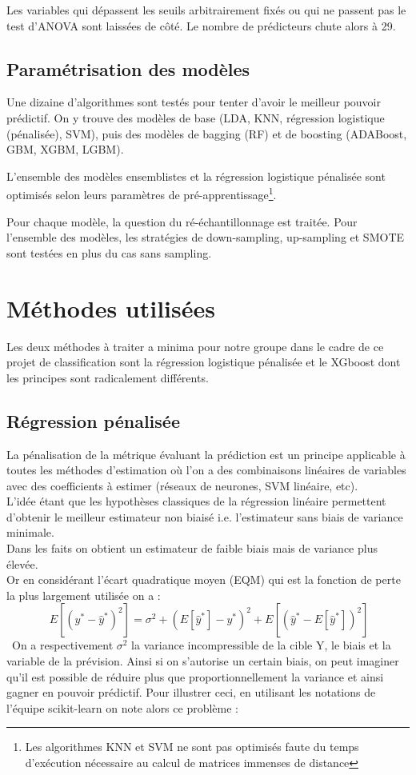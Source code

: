 \documentclass[french]{article}
\begin{document}
\begin{multicols}{2}
Les variables qui dépassent les seuils arbitrairement fixés ou qui ne passent pas le test d'ANOVA sont laissées de côté. Le nombre de prédicteurs chute alors à 29. %

\subsection{Paramétrisation des modèles}

Une dizaine d'algorithmes sont testés pour tenter d'avoir le meilleur pouvoir prédictif. On y trouve des modèles de base (LDA, KNN, régression logistique (pénalisée), SVM), puis des modèles de bagging (RF) et de boosting (ADABoost, GBM, XGBM, LGBM).

L'ensemble des modèles ensemblistes et la régression logistique pénalisée sont optimisés selon leurs paramètres de pré-apprentissage\footnote{Les algorithmes KNN et SVM ne sont pas optimisés faute du temps d'exécution nécessaire au calcul de matrices immenses de distance}.

Pour chaque modèle, la question du ré-échantillonnage est traitée. Pour l'ensemble des modèles, les stratégies de down-sampling, up-sampling et SMOTE sont testées en plus du cas sans sampling.





\section{Méthodes utilisées}
Les deux méthodes à traiter a minima pour notre groupe dans le cadre de ce projet de classification sont la régression logistique pénalisée et le XGboost dont les principes sont radicalement différents.


\subsection{Régression pénalisée}
La pénalisation de la métrique évaluant la prédiction est un principe applicable à toutes les méthodes d'estimation où l’on a des combinaisons linéaires de variables avec des coefficients à estimer (réseaux de neurones, SVM linéaire, etc).\\
L'idée étant que les hypothèses classiques de la régression linéaire permettent d'obtenir le meilleur estimateur non biaisé i.e. l'estimateur sans biais de variance minimale.\\
Dans les faits on obtient un estimateur de faible biais mais de variance plus élevée.\\
Or en considérant l'écart quadratique moyen (EQM) qui est la fonction de perte la plus largement utilisée on a : \[\ E\left[\left(y^{*}-\hat{y}^{*}\right)^{2}\right]=\sigma^{2}+\left(E\left[\hat{y}^{*}\right]-y^{*}\right)^{2}+E\left[\left(\hat{y}^{*}-E\left[\hat{y}^{*}\right]\right)^{2}\right] \]\ 
On a respectivement $\sigma^{2}$ la variance incompressible de la cible Y, le biais et la variable de la prévision. Ainsi si on s'autorise un certain biais, on peut imaginer qu'il est possible de réduire plus que proportionnellement la variance et ainsi gagner en pouvoir prédictif. Pour illustrer ceci, en utilisant les notations de l'équipe scikit-learn on note alors ce problème : 


\end{multicols}
\end{document}
